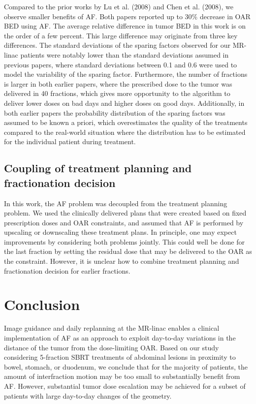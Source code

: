 \documentclass[11pt]{article}
\begin{document}
Compared to the prior works by Lu et al. (2008) and Chen et al. (2008), we observe smaller benefits of AF. Both papers reported up to 30\% decrease in OAR BED using AF. The average relative difference in tumor BED in this work is on the order of a few percent. This large difference may originate from three key differences. The standard deviations of the sparing factors observed for our MR-linac patients were notably lower than the standard deviations assumed in previous papers, where standard deviations between 0.1 and 0.6 were used to model the variability of the sparing factor. Furthermore, the number of fractions is larger in both earlier papers, where the prescribed dose to the tumor was delivered in 40 fractions, which gives more opportunity to the algorithm to deliver lower doses on bad days and higher doses on good days. Additionally, in both earlier papers the probability distribution of the sparing factors was assumed to be known a priori, which overestimates the quality of the treatments compared to the real-world situation where the distribution has to be estimated for the individual patient during treatment.

\subsection{Coupling of treatment planning and fractionation decision}

In this work, the AF problem was decoupled from the treatment planning problem. We used the clinically delivered plans that were created based on fixed prescription doses and OAR constraints, and assumed that AF is performed by upscaling or downscaling these treatment plans. In principle, one may expect improvements by considering both problems jointly. This could well be done for the last fraction by setting the residual dose that may be delivered to the OAR as the constraint. However, it is unclear how to combine treatment planning and fractionation decision for earlier fractions.

\section{Conclusion}

Image guidance and daily replanning at the MR-linac enables a clinical implementation of AF as an approach to exploit day-to-day variations in the distance of the tumor from the dose-limiting OAR. Based on our study considering 5-fraction SBRT treatments of abdominal lesions in proximity to bowel, stomach, or duodenum, we conclude that for the majority of patients, the amount of interfraction motion may be too small to substantially benefit from AF. However, substantial tumor dose escalation may be achieved for a subset of patients with large day-to-day changes of the geometry.
\end{document}
